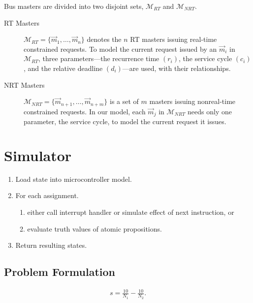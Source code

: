\documentclass[prodmode,acmtecs]{acmsmall}
\begin{document}
Bus masters are divided into two disjoint sets, $\mathcal{M}_{RT}$
and $\mathcal{M}_{NRT}$.
\begin{description}
\item[RT Masters]
$\mathcal{M}_{RT}=\{ \vec{m}_{1},\dots,\vec{m}_{n}\}$ denotes the
$n$ RT masters issuing real-time constrained requests. To model the
current request issued by an $\vec{m}_{i}$ in $\mathcal{M}_{RT}$,
three parameters---the recurrence time $(r_i)$, the service cycle
$(c_i)$, and the relative deadline $(d_i)$---are used, with their
relationships.
\item[NRT Masters]
$\mathcal{M}_{NRT}=\{ \vec{m}_{n+1},\dots,\vec{m}_{n+m}\}$ is a set
of $m$ masters issuing nonreal-time constrained requests. In our
model, each $\vec{m}_{j}$ in $\mathcal{M}_{NRT}$ needs only one
parameter, the service cycle, to model the current request it
issues.
\end{description}

\section{Simulator}
\label{sec:sim}

\begin{enumerate}
\item Load state into microcontroller model.
\item For each assignment.
      \begin{enumerate}
      \item either call interrupt handler or simulate effect of next instruction, or
      \item evaluate truth values of atomic propositions.
      \end{enumerate}
\item Return resulting states.
\end{enumerate}


\subsection{Problem Formulation}


\begin{eqnarray}%
s=\frac{10}{N_{1}}-\frac{10}{N_{2}}. \nonumber
\end{eqnarray}%
\end{document}
